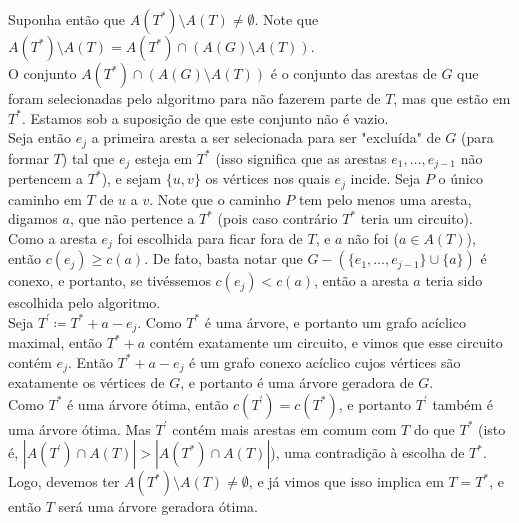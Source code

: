 \documentclass{article}
\begin{document}
\begin{enumerate}[itemsep=3ex, label=E\textbf{\arabic*}.]
    Suponha então que $A(T^*)  \setminus A(T) \neq \emptyset$. Note que $A(T^*)  \setminus A(T) = A(T^*) \cap (A(G) \setminus A(T))$.\\
    O conjunto $A(T^*) \cap (A(G) \setminus A(T))$ é o conjunto das arestas de $G$ que foram selecionadas pelo algoritmo para não fazerem parte de $T$, mas que estão em $T^*$. Estamos sob a suposição de que este conjunto não é vazio.\\
    Seja então $e_j$ a primeira aresta a ser selecionada para ser "excluída" de $G$ (para formar $T$) tal que $e_j$ esteja em $T^*$ (isso significa que as arestas $e_1, \ldots, e_{j-1}$ não pertencem a $T^*$), e sejam $\{u, v\}$ os vértices nos quais $e_j$ incide. Seja $P$ o único caminho em $T$ de $u$ a $v$. Note que o caminho $P$ tem pelo menos uma aresta, digamos $a$, que não pertence a $T^*$ (pois caso contrário $T^*$ teria um circuito). Como a aresta $e_j$ foi escolhida para ficar fora de $T$, e $a$ não foi ($a \in A(T)$), então $c(e_j) \geq c(a)$. De fato, basta notar que $G - (\{e_1, \ldots, e_{j-1}\} \cup \{a\})$ é conexo, e portanto, se tivéssemos $c(e_j) < c(a)$, então a aresta $a$ teria sido escolhida pelo algoritmo.\\
    Seja $T^\prime \coloneqq T^* + a - e_j$. Como $T^*$ é uma árvore, e portanto um grafo acíclico maximal, então $T^* + a$ contém exatamente um circuito, e vimos que esse circuito contém $e_j$. Então $T^* + a - e_j$ é um grafo conexo acíclico cujos vértices são exatamente os vértices de $G$, e portanto é uma árvore geradora de $G$.\\
    Como $T^*$ é uma árvore ótima, então $c(T^\prime) = c(T^*)$, e portanto $T^\prime$ também é uma árvore ótima. Mas $T^\prime$ contém mais arestas em comum com $T$ do que $T^*$ (isto é, $|A(T^\prime) \cap A(T)| > |A(T^*) \cap A(T)|$), uma contradição à escolha de $T^*$. Logo, devemos ter $A(T^*)  \setminus A(T) \neq \emptyset$, e já vimos que isso implica em $T = T^*$, e então $T$ será uma árvore geradora ótima.
\end{enumerate}
\end{document}
